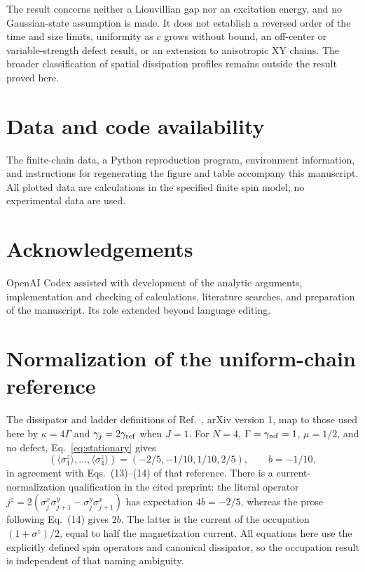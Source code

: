 \documentclass[11pt,a4paper]{article}
\begin{document}
The result concerns neither a Liouvillian gap nor an excitation
energy, and no Gaussian-state assumption is made. It does not
establish a reversed order of the time and size limits, uniformity
as $c$ grows without bound, an off-center or variable-strength
defect result, or an extension to anisotropic XY chains.
The broader classification of spatial dissipation profiles remains
outside the result proved here.

\section*{Data and code availability}
The finite-chain data, a Python reproduction program, environment
information, and instructions for regenerating the figure and table
accompany this manuscript. All plotted data are calculations in the
specified finite spin model; no experimental data are used.

\section*{Acknowledgements}
OpenAI Codex assisted with development of the analytic arguments,
implementation and checking of calculations, literature searches, and
preparation of the manuscript. Its role extended beyond language editing.

\appendix
\section{Normalization of the uniform-chain reference}
The dissipator and ladder definitions of
Ref.~\cite{Znidaric2010}, arXiv version 1, map to those used here by
$\kappa=4\Gamma$ and $\gamma_j=2\gamma_{\rm ref}$ when $J=1$.
For $N=4$, $\Gamma=\gamma_{\rm ref}=1$, $\mu=1/2$, and no defect,
Eq.~\eqref{eq:stationary} gives
\begin{equation}
 (\langle\sigma_1^z\rangle,\ldots,\langle\sigma_4^z\rangle)
 =(-2/5,-1/10,1/10,2/5),\qquad b=-1/10,
\end{equation}
in agreement with Eqs.~(13)--(14) of that reference.
There is a current-normalization qualification in the cited preprint:
the literal operator $j^z=2(\sigma_j^x\sigma_{j+1}^y-
\sigma_j^y\sigma_{j+1}^x)$ has expectation $4b=-2/5$,
whereas the prose following Eq.~(14) gives $2b$.
The latter is the current of the occupation
$(1+\sigma^z)/2$, equal to half the magnetization current.
All equations here use the explicitly defined spin operators and
canonical dissipator, so the occupation result is independent of
that naming ambiguity.



\end{document}
